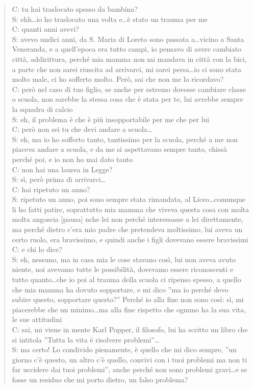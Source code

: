 \begin{verse}
C: tu hai traslocato spesso da bambina?\\
S: ehh\ldots{}io ho traslocato una volta e\ldots{}è stato un trauma per me\\
C: quanti anni avevi?\\
S: avevo undici anni, da S. Maria di Loreto sono passata a\ldots{}vicino a Santa Veneranda, e a quell'epoca era tutto campi, io pensavo di avere cambiato città, addirittura, perché mia mamma non mi mandava in città con la bici, a parte che non sarei riuscita ad arrivarci, mi sarei persa\ldots{}io ci sono stata molto male, ci ho sofferto molto. Però, sai che non me lo ricordavo?\\
C: però nel caso di tuo figlio, se anche per estremo dovesse cambiare classe o scuola, non sarebbe la stessa cosa che è stata per te, lui avrebbe sempre la squadra di calcio\\
S: eh, il problema è che è più insopportabile per me che per lui\\
C: però non sei tu che devi andare a scuola\ldots\\
S: eh, ma io ho sofferto tanto, tantissimo per la scuola, perché a me non piaceva andare a scuola, e da me si aspettavano sempre tanto, chissà perché poi, e io non ho mai dato tanto\\
C: non hai una laurea in Legge?\\
S: sì, però prima di arrivarci\ldots\\
C: hai ripetuto un anno?\\
S: ripetuto un anno, poi sono sempre stata rimandata, al Liceo\ldots{}comunque li ho fatti patire, soprattutto mia mamma che viveva questa cosa con molta molta angoscia [pausa] nche lei non perché interessasse a lei direttamente, ma perché dietro c'era mio padre che pretendeva moltissimo, lui aveva un certo ruolo, era bravissimo, e quindi anche i figli dovevano essere bravissimi\\
C: e chi lo dice?\\
S: eh, nessuno, ma in casa mia le cose stavano così, lui non aveva avuto niente, noi avevamo tutte le possibilità, dovevamo essere riconoscenti e tutto quanto\ldots{}che io poi al trauma della scuola ci ripenso spesso, a quello che mia mamma ha dovuto sopportare, e mi dico ''ma io perché devo subire questo, sopportare questo?'' Perché io alla fine non sono così: sì, mi piacerebbe che un minimo\ldots{}ma alla fine rispetto che ognuno ha la sua vita, le sue attitudini\\
C: sai, mi viene in mente Karl Popper, il filosofo, lui ha scritto un libro che si intitola ''Tutta la vita è risolvere problemi''\ldots\\
S: ma certo! Lo condivido pienamente, è quello che mi dico sempre, ''un giorno c'è questo, un altro c'è quello, convivi con i tuoi problemi ma non ti far uccidere dai tuoi problemi'', anche perché non sono problemi gravi\ldots{}e se fosse un residuo che mi porto dietro, un falso problema?\\
\end{verse}

